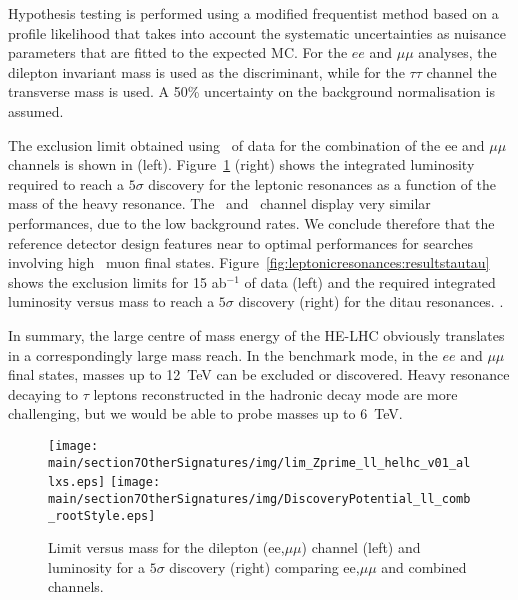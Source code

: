 Hypothesis testing is performed using a modified frequentist method based on a profile likelihood that takes into account the systematic uncertainties as nuisance parameters that are fitted to the expected MC. For the $ee$ and $\mu\mu$ analyses, the dilepton invariant mass is used as the discriminant, while for the $\tau\tau$ channel the transverse mass is used. A 50\% uncertainty on the background normalisation is assumed.

The exclusion limit obtained using \intlumihelhc\ of data for the combination of the ee and $\mu\mu$ channels is shown in  (left). Figure~\ref{fig:leptonicresonances:resultsll} (right) shows the integrated luminosity required to reach a $5\sigma$ discovery for the leptonic resonances as a function of the mass of the heavy resonance. The \Zpee\ and \Zpmumu\ channel display very similar performances, due to the low background rates. We conclude therefore that the reference detector design features near to optimal performances for searches involving high \pT\ muon final states. Figure~\ref{fig:leptonicresonances:resultstautau} shows the exclusion limits for 15 ab$^{-1}$ of data (left) and the required integrated luminosity
versus mass to reach a $5\sigma$ discovery (right) for the ditau resonances. .

In summary, the large centre of mass energy of the HE-LHC obviously translates in a correspondingly large mass reach. In the benchmark \ZpSSM mode, in the $ee$ and $\mu\mu$ final states, masses up to 12~TeV can be excluded or discovered. Heavy resonance decaying to $\tau$ leptons reconstructed in the hadronic decay mode are more challenging, but we would be able to probe masses up to 6~TeV.

  \begin{figure}[htbp]
  \centering
  \texttt{[image: \\main/section7OtherSignatures/img/lim\_Zprime\_ll\_helhc\_v01\_allxs.eps]}
  \texttt{[image: \\main/section7OtherSignatures/img/DiscoveryPotential\_ll\_comb\_rootStyle.eps]}
  \caption{Limit versus mass for the dilepton (ee,$\mu\mu$) channel (left) and luminosity for a $5\sigma$ discovery (right) comparing ee,$\mu\mu$ and combined channels. }
  \label{fig:leptonicresonances:resultsll}
\end{figure}

